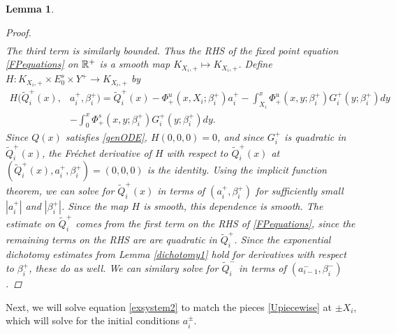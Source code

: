 \documentclass[10pt,reqno]{amsart}
\theoremstyle{plain}
\newtheorem{lemma}[theorem]{Lemma}
\theoremstyle{definition}
\theoremstyle{remark}
\numberwithin{theorem}{section}
\numberwithin{equation}{section}
\begin{document}
\begin{lemma}
\begin{proof}
\begin{align*}
\end{align*}
The third term is similarly bounded. Thus the RHS of the fixed point equation \eqref{FPequations} on $\mathbb{R}^+$ is a smooth map $K_{X_i, +} \mapsto K_{X_i, +}$. Define $H: K_{X_i, +} \times E_0^s \times Y^+ \rightarrow K_{X_i, +}$ by
\begin{align*}
H(\tilde{Q}_i^+(x), &a_i^+, \beta_i^+) = \tilde{Q}_i^+(x) - \Phi^u_+(x, X_i; \beta_i^+) a_i^+ - \int_{X_i}^x \Phi_+^u(x, y; \beta_i^+) G_i^+(y; \beta_i^+)dy \\
&- \int_0^x \Phi_+^s(x, y; \beta_i^+) G_i^+(y; \beta_i^+)dy.
\end{align*}
Since $Q(x)$ satisfies \eqref{genODE}, $H(0, 0, 0) = 0$, and since $G_i^+$ is quadratic in $\tilde{Q}_i^+(x)$, the Fr\'echet derivative of $H$ with respect to $\tilde{Q}_i^+(x)$ at $(\tilde{Q}_i^+(x), a_i^+, \beta_i^+) = (0, 0, 0)$ is the identity. Using the implicit function theorem, we can solve for $\tilde{Q}_i^+(x)$ in terms of $(a_i^+, \beta_i^+)$ for sufficiently small $|a_i^+|$ and $|\beta_i^+|$. Since the map $H$ is smooth, this dependence is smooth. The estimate on $\tilde{Q}_i^+$ comes from the first term on the RHS of \eqref{FPequations}, since the remaining terms on the RHS are are quadratic in $\tilde{Q}_i^+$. Since the exponential dichotomy estimates from Lemma \ref{dichotomy1} hold for derivatives with respect to $\beta_i^+$, these do as well. We can similary solve for $\tilde{Q}_i^-$ in terms of $(a_{i-1}^-, \beta_i^-)$.
\end{proof}
\end{lemma}

Next, we will solve equation \cref{exsystem2} to match the pieces \cref{Upiecewise} at $\pm X_i$, which will solve for the initial conditions $a_i^\pm$.
\end{document}
